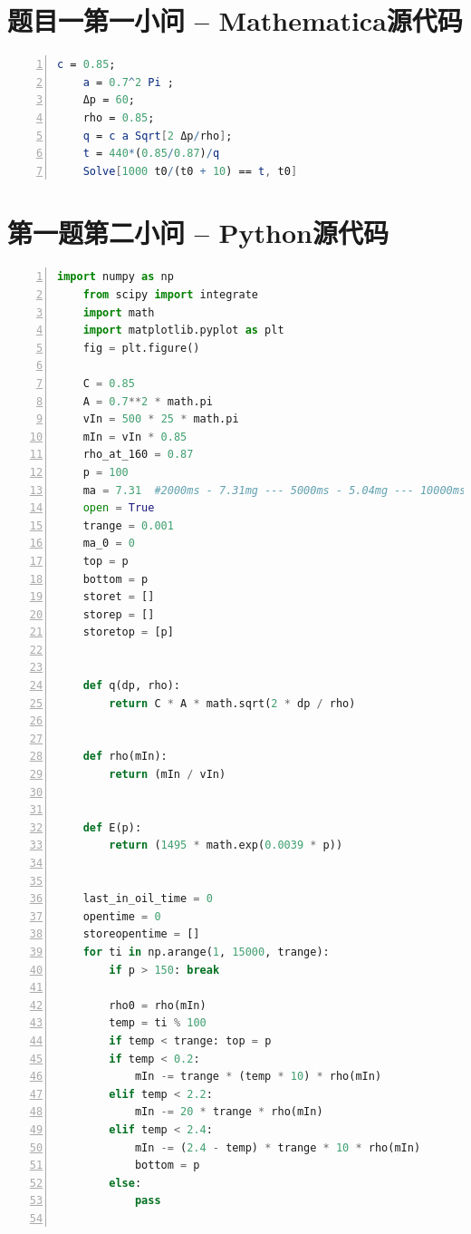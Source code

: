 \documentclass{cumcmthesis}
\begin{document}
\newpage
\begin{appendices}
\section{题目一第一小问 -- Mathematica源代码}
\begin{lstlisting}[language=mathematica,numbers=left, numberstyle=\tiny]
    c = 0.85;
    a = 0.7^2 Pi ;
    Δp = 60;
    rho = 0.85;
    q = c a Sqrt[2 Δp/rho];
    t = 440*(0.85/0.87)/q
    Solve[1000 t0/(t0 + 10) == t, t0]
 \end{lstlisting}
\section{第一题第二小问 -- Python源代码}
\begin{lstlisting}[language=python,numbers=left, numberstyle=\tiny]
    import numpy as np
    from scipy import integrate
    import math
    import matplotlib.pyplot as plt
    fig = plt.figure()
    
    C = 0.85
    A = 0.7**2 * math.pi
    vIn = 500 * 25 * math.pi
    mIn = vIn * 0.85
    rho_at_160 = 0.87
    p = 100
    ma = 7.31  #2000ms - 7.31mg --- 5000ms - 5.04mg --- 10000ms - 4.31mg
    open = True
    trange = 0.001
    ma_0 = 0
    top = p
    bottom = p
    storet = []
    storep = []
    storetop = [p]
    
    
    def q(dp, rho):
        return C * A * math.sqrt(2 * dp / rho)
    
    
    def rho(mIn):
        return (mIn / vIn)
    
    
    def E(p):
        return (1495 * math.exp(0.0039 * p))
    
    
    last_in_oil_time = 0
    opentime = 0
    storeopentime = []
    for ti in np.arange(1, 15000, trange):
        if p > 150: break
    
        rho0 = rho(mIn)
        temp = ti % 100
        if temp < trange: top = p
        if temp < 0.2:
            mIn -= trange * (temp * 10) * rho(mIn)
        elif temp < 2.2:
            mIn -= 20 * trange * rho(mIn)
        elif temp < 2.4:
            mIn -= (2.4 - temp) * trange * 10 * rho(mIn)
            bottom = p
        else:
            pass
    

\end{lstlisting}
\end{appendices}
\end{document}
